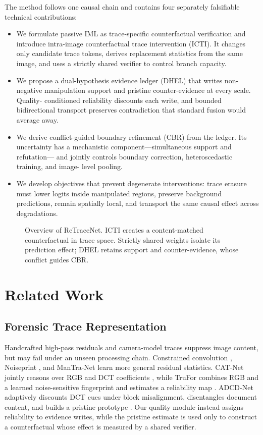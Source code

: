 \documentclass[journal]{IEEEtran}
\newcommand{\method}{ReTraceNet}
\begin{document}
The method follows one causal chain and contains four separately falsifiable
technical contributions:
\begin{itemize}
\item We formulate passive IML as trace-specific counterfactual verification and
introduce intra-image counterfactual trace intervention (ICTI). It changes only
candidate trace tokens, derives replacement statistics from the same image, and
uses a strictly shared verifier to control branch capacity.
\item We propose a dual-hypothesis evidence ledger (DHEL) that writes non-negative
manipulation support and pristine counter-evidence at every scale. Quality-
conditioned reliability discounts each write, and bounded bidirectional transport
preserves contradiction that standard fusion would average away.
\item We derive conflict-guided boundary refinement (CBR) from the ledger. Its
uncertainty has a mechanistic component---simultaneous support and refutation---
and jointly controls boundary correction, heteroscedastic training, and image-
level pooling.
\item We develop objectives that prevent degenerate interventions: trace erasure
must lower logits inside manipulated regions, preserve background predictions,
remain spatially local, and transport the same causal effect across degradations.
\end{itemize}

\begin{figure}[t]
\centering
\resizebox{0.98\textwidth}{!}{}
\caption{Overview of \method. ICTI creates a content-matched counterfactual in
trace space. Strictly shared weights isolate its prediction effect; DHEL retains
support and counter-evidence, whose conflict guides CBR.}
\label{fig:overview}
\end{figure}

\section{Related Work}
\subsection{Forensic Trace Representation}
Handcrafted high-pass residuals and camera-model traces suppress image content,
but may fail under an unseen processing chain.  Constrained convolution
\cite{bayar2018constrained}, Noiseprint \cite{cozzolino2020noiseprint}, and
ManTra-Net \cite{wu2019mantranet} learn more general residual statistics.
CAT-Net jointly reasons over RGB and DCT coefficients \cite{kwon2021catnet}, while
TruFor combines RGB and a learned noise-sensitive fingerprint and estimates a
reliability map \cite{guillaro2023trufor}. ADCD-Net adaptively discounts DCT cues
under block misalignment, disentangles document content, and builds a pristine
prototype \cite{wong2025adcd}. Our quality module instead assigns reliability to
evidence writes, while the pristine estimate is used only to construct a
counterfactual whose effect is measured by a shared verifier.
\end{document}
